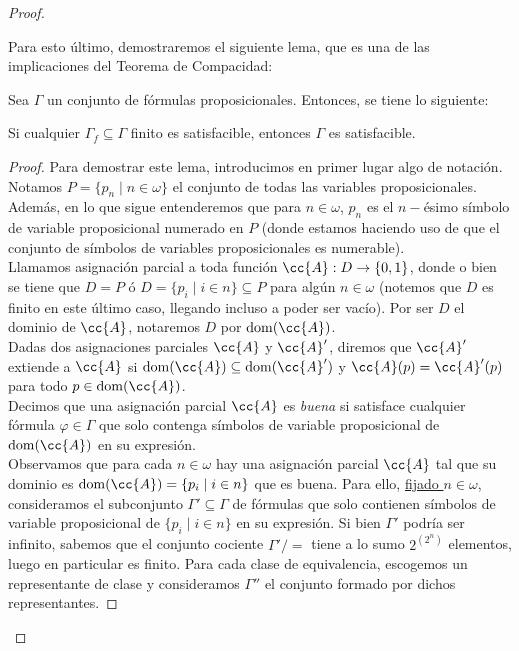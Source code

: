 \documentclass[12pt]{article}
\DeclareMathOperator{\dom}{dom}
\begin{document}
\begin{ejercicio}
\begin{proof}
\begin{description}
                Para esto último, demostraremos el siguiente lema, que es una de las implicaciones del Teorema de Compacidad:
                \begin{lema}
                    Sea $\Gamma$ un conjunto de fórmulas proposicionales.
                    Entonces, se tiene lo siguiente:
                    \begin{center}
                        Si cualquier $\Gamma_f\subseteq \Gamma$ finito es satisfacible, entonces $\Gamma$ es satisfacible.
                    \end{center}
                    \begin{proof}
                        Para demostrar este lema, introducimos en primer lugar algo de notación.\\
                        
                        Notamos $P=\{p_n\mid n\in \omega\}$ el conjunto de todas las variables proposicionales. Además,
                        en lo que sigue entenderemos que para $n\in \omega$, $p_n$ es el $n-$ésimo símbolo de variable proposicional
                        numerado en $P$ (donde estamos haciendo uso de que el conjunto de símbolos de variables proposicionales es numerable).\\
                        
                        Llamamos asignación parcial a toda función $\cc{A}:D\to \{0,1\}$, donde o bien se tiene que $D=P$ ó $D=\{p_i\mid i\in n\}\subseteq P$ para algún $n\in \omega$
                        (notemos que $D$ es finito en este último caso, llegando incluso a poder ser vacío).
                        Por ser $D$ el dominio de $\cc{A}$, notaremos $D$ por $\dom(\cc{A})$.\\

                        Dadas dos asignaciones parciales $\cc{A}$ y $\cc{A}'$, diremos que $\cc{A}'$ extiende a $\cc{A}$ si $\dom(\cc{A})\subseteq \dom(\cc{A}')$ y $\cc{A}(p)=\cc{A}'(p)$ para todo $p\in \dom(\cc{A})$.\\

                        Decimos que una asignación parcial $\cc{A}$ es \emph{buena} si satisface cualquier fórmula $\varphi\in \Gamma$ que solo contenga símbolos de variable proposicional de $\dom(\cc{A})$ en su expresión.\\

                        Observamos que para cada $n\in \omega$ hay una asignación parcial $\cc{A}$ tal que su dominio es $\dom(\cc{A})=\{p_i\mid i\in n\}$ que es buena.
                        Para ello, \ul{fijado $n\in \omega$}, consideramos el subconjunto $\Gamma'\subseteq \Gamma$ de fórmulas que solo contienen símbolos de variable proposicional de $\{p_i\mid i\in n\}$ en su expresión.
                        Si bien $\Gamma'$ podría ser infinito, sabemos que el conjunto cociente $\Gamma'/=$ tiene a lo sumo $2^{(2^n)}$ elementos, luego en particular es finito.
                        Para cada clase de equivalencia, escogemos un representante de clase y consideramos $\Gamma''$ el conjunto formado por dichos representantes.


\end{proof}
\end{lema}
\end{description}
\end{proof}
\end{ejercicio}
\end{document}
